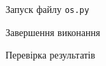 \documentclass[a4paper,14pt]{extarticle} %
\begin{document}
\begin{figure}[H]
    \caption{Запуск файлу \texttt{os.py}}
    \label{fig:1}
\end{figure}

\begin{figure}[H]
    \caption{Завершення виконання}
    \label{fig:2}
\end{figure}

\begin{figure}[H]
    \caption{Перевірка результатів}
    \label{fig:3}
\end{figure}
\end{document}
